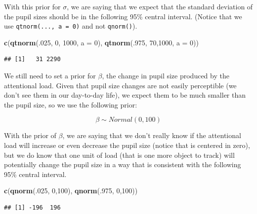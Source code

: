 \documentclass[12pt,]{krantz}
\newenvironment{Shaded}{\begin{snugshade}}{\end{snugshade}}
\newcommand{\DataTypeTok}[1]{\textcolor[rgb]{0.13,0.29,0.53}{#1}}
\newcommand{\DecValTok}[1]{\textcolor[rgb]{0.00,0.00,0.81}{#1}}
\newcommand{\KeywordTok}[1]{\textcolor[rgb]{0.13,0.29,0.53}{\textbf{#1}}}
\newcommand{\NormalTok}[1]{#1}
\theoremstyle{definition}
\theoremstyle{definition}
\theoremstyle{definition}
\theoremstyle{remark}
\begin{document}
With this prior for \(\sigma\), we are saying that we expect that the standard deviation of the pupil sizes should be in the following 95\% central interval. (Notice that we use \texttt{qtnorm(...,\ a\ =\ 0)} and not \texttt{qnorm()}).

\begin{Shaded}
\begin{Highlighting}[]
\KeywordTok{c}\NormalTok{(}\KeywordTok{qtnorm}\NormalTok{(.}\DecValTok{025}\NormalTok{, }\DecValTok{0}\NormalTok{, }\DecValTok{1000}\NormalTok{, }\DataTypeTok{a =} \DecValTok{0}\NormalTok{), }\KeywordTok{qtnorm}\NormalTok{(.}\DecValTok{975}\NormalTok{, }\DecValTok{70}\NormalTok{,}\DecValTok{1000}\NormalTok{, }\DataTypeTok{a =} \DecValTok{0}\NormalTok{))}
\end{Highlighting}
\end{Shaded}

\begin{verbatim}
## [1]   31 2290
\end{verbatim}

We still need to set a prior for \(\beta\), the change in pupil size produced by the attentional load. Given that pupil size changes are not easily perceptible (we don't see them in our day-to-day life), we expect them to be much smaller than the pupil size, so we use the following prior:

\begin{equation}
\beta \sim Normal(0, 100)
\end{equation}

With the prior of \(\beta\), we are saying that we don't really know if the attentional load will increase or even decrease the pupil size (notice that is centered in zero), but we do know that one unit of load (that is one more object to track) will potentially change the pupil size in a way that is consistent with the following 95\% central interval.

\begin{Shaded}
\begin{Highlighting}[]
\KeywordTok{c}\NormalTok{(}\KeywordTok{qnorm}\NormalTok{(.}\DecValTok{025}\NormalTok{, }\DecValTok{0}\NormalTok{,}\DecValTok{100}\NormalTok{), }\KeywordTok{qnorm}\NormalTok{(.}\DecValTok{975}\NormalTok{, }\DecValTok{0}\NormalTok{,}\DecValTok{100}\NormalTok{))}
\end{Highlighting}
\end{Shaded}

\begin{verbatim}
## [1] -196  196
\end{verbatim}
\end{document}
